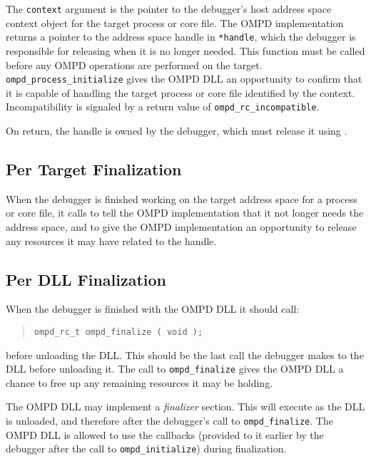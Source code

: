 The \verb|context| argument is the pointer to the debugger's host
address space context object for the target process or core file.
The OMPD implementation returns a pointer to the address space handle
in \verb|*handle|, which the debugger is responsible for releasing
when it is no longer needed.
This function must be called before any OMPD operations are performed
on the target.
\verb|ompd_process_initialize| gives the OMPD DLL an opportunity
to confirm that it is capable of handling the target process or core file 
identified
by the context.
Incompatibility is signaled by a return value of \verb|ompd_rc_incompatible|.

On return, the handle is owned by the debugger, which must release it
using
.

\subsection{Per Target Finalization}


When the debugger is finished working on the target address space
for a process or core file, it calls
to tell the OMPD implementation that it not longer needs the address space,
and to give the OMPD implementation an opportunity to release any
resources it may have related to the handle.


\subsection{Per DLL Finalization}

When the debugger is finished with the OMPD DLL it should call:
\begin{quote}
\begin{lstlisting}
ompd_rc_t ompd_finalize ( void );
\end{lstlisting}
\end{quote}
before unloading the DLL.
This should be the last call the debugger makes to the DLL before
unloading it.
The call to \verb|ompd_finalize| gives the OMPD DLL a chance to
free up any remaining resources it may be holding.

The OMPD DLL may implement a \emph{finalizer} section.
This will execute as the DLL is unloaded, and therefore after
the debugger's call to \verb|ompd_finalize|.
The OMPD DLL is allowed to use the callbacks (provided to it earlier
by the debugger after the call to \verb|ompd_initialize|) during finalization.